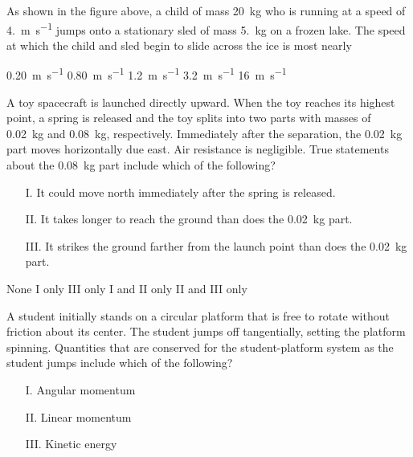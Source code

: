 \documentclass[12pt]{../../oss-classkick-exam}
\begin{document}
\begin{questions}
  
  \question As shown in the figure above, a child of mass \SI{20}{\kilo\gram}
  who is running at a speed of \SI{4.}{\metre\per\second} jumps onto a
  stationary sled of mass \SI{5.}{\kilo\gram} on a frozen lake. The speed at
  which the child and sled begin to slide across the ice is most nearly

  \begin{oneparchoices}
    \choice \SI{.20}{\metre\per\second}
    \choice \SI{.80}{\metre\per\second}
    \choice \SI{1.2}{\metre\per\second}
    \choice \SI{3.2}{\metre\per\second}
    \choice \SI{16}{\metre\per\second}
  \end{oneparchoices}
  \vspace{.3in}
  
  \question A toy spacecraft is launched directly upward. When the toy reaches
  its highest point, a spring is released and the toy splits into two parts
  with masses of \SI{.02}{\kilo\gram} and \SI{.08}{\kilo\gram}, respectively.
  Immediately after the separation, the \SI{.02}{\kilo\gram} part moves
  horizontally due east. Air resistance is negligible. True statements about
  the \SI{.08}{\kilo\gram} part include which of the following?
  \begin{enumerate}[nosep]
  \item[I.] It could move north immediately after the spring is released.
  \item[II.] It takes longer to reach the ground than does the
    \SI{.02}{\kilo\gram} part.
  \item[III.] It strikes the ground farther from the launch point than does the
    \SI{.02}{\kilo\gram} part.
  \end{enumerate}
  \begin{choices}
    \choice None
    \choice I only
    \choice III only
    \choice I and II only
    \choice II and III only
  \end{choices}
  
  \question A student initially stands on a circular platform that is free to
  rotate without friction about its center. The student jumps off tangentially,
  setting the platform spinning. Quantities that are conserved for the
  student-platform system as the student jumps include which of the following?
  \begin{enumerate}[nosep]
  \item[I.] Angular momentum
  \item[II.] Linear momentum
  \item[III.] Kinetic energy
  \end{enumerate}
  

\end{questions}
\end{document}
